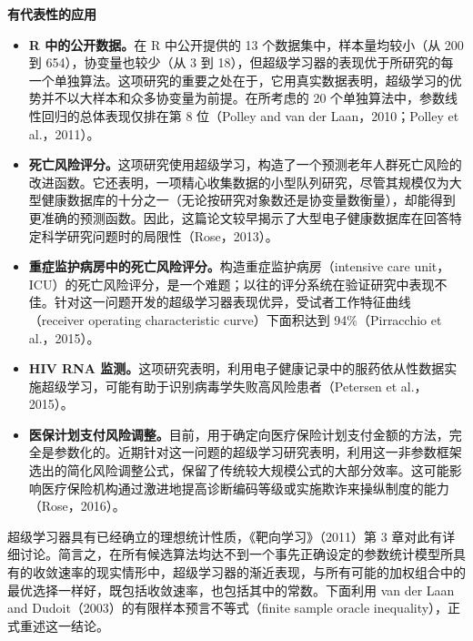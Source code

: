 \medskip
\noindent\textbf{有代表性的应用}
\begin{itemize}[leftmargin=1.8em,itemsep=.5em]
 \item \textbf{R 中的公开数据。}在 R 中公开提供的 13 个数据集中，样本量均较小（从 200 到 654），协变量也较少（从 3 到 18），但超级学习器的表现优于所研究的每一个单独算法。这项研究的重要之处在于，它用真实数据表明，超级学习的优势并不以大样本和众多协变量为前提。在所考虑的 20 个单独算法中，参数线性回归的总体表现仅排在第 8 位（Polley and van der Laan，2010；Polley et al.，2011）。
 \item \textbf{死亡风险评分。}这项研究使用超级学习，构造了一个预测老年人群死亡风险的改进函数。它还表明，一项精心收集数据的小型队列研究，尽管其规模仅为大型健康数据库的十分之一（无论按研究对象数还是协变量数衡量），却能得到更准确的预测函数。因此，这篇论文较早揭示了大型电子健康数据库在回答特定科学研究问题时的局限性（Rose，2013）。
 \item \textbf{重症监护病房中的死亡风险评分。}构造重症监护病房（intensive care unit，ICU）的死亡风险评分，是一个难题；以往的评分系统在验证研究中表现不佳。针对这一问题开发的超级学习器表现优异，受试者工作特征曲线（receiver operating characteristic curve）下面积达到 94\%（Pirracchio et al.，2015）。
 \item \textbf{HIV RNA 监测。}这项研究表明，利用电子健康记录中的服药依从性数据实施超级学习，可能有助于识别病毒学失败高风险患者（Petersen et al.，2015）。
 \item \textbf{医保计划支付风险调整。}目前，用于确定向医疗保险计划支付金额的方法，完全是参数化的。近期针对这一问题的超级学习研究表明，利用这一非参数框架选出的简化风险调整公式，保留了传统较大规模公式的大部分效率。这可能影响医疗保险机构通过激进地提高诊断编码等级或实施欺诈来操纵制度的能力（Rose，2016）。
\end{itemize}

超级学习器具有已经确立的理想统计性质，《靶向学习》（2011）第 3 章对此有详细讨论。简言之，在所有候选算法均达不到一个事先正确设定的参数统计模型所具有的收敛速率的现实情形中，超级学习器的渐近表现，与所有可能的加权组合中的最优选择一样好，既包括收敛速率，也包括其中的常数。下面利用 van der Laan and Dudoit（2003）的有限样本预言不等式（finite sample oracle inequality），正式重述这一结论。

